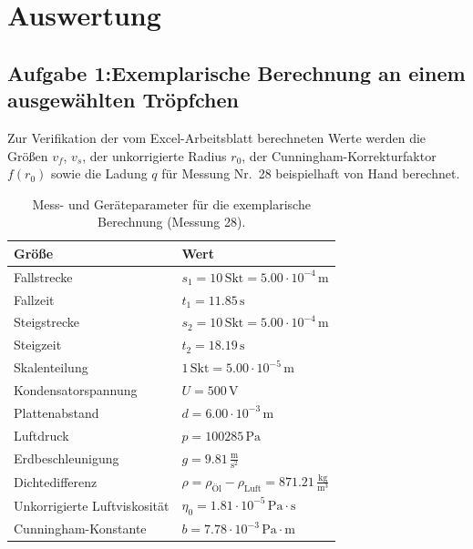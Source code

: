 \documentclass[12pt,a4paper,titlepage]{scrartcl}
\numberwithin{equation}{section}
\numberwithin{table}{section}
\numberwithin{figure}{section}
\begin{document}
\begin{table}[htbp]
  \centering
  \small
  \caption{Messwerte zur Bestimmung der Elementarladung.}
    \label{table: Messung}
\end{table}



\section{Auswertung}

\subsection{Aufgabe 1:Exemplarische Berechnung an einem ausgewählten Tröpfchen}
Zur Verifikation der vom Excel-Arbeitsblatt berechneten Werte werden die Größen $v_f$, $v_s$, der unkorrigierte Radius $r_0$, der Cunningham-Korrekturfaktor $f(r_0)$ sowie die Ladung $q$ für Messung Nr.~28 beispielhaft von Hand berechnet.

\begin{table}[H]
    \centering
    \caption{Mess- und Geräteparameter für die exemplarische Berechnung (Messung 28).}
    \label{tab:parameter_messung_28}
    \begin{tabular}{ll}
        \toprule
        \textbf{Größe} & \textbf{Wert} \\
        \midrule
        Fallstrecke & $s_1 = 10\,\text{Skt} = 5.00 \cdot 10^{-4}\,\text{m}$ \\
        Fallzeit & $t_1 = 11.85\,\text{s}$ \\
        Steigstrecke & $s_2 = 10\,\text{Skt} = 5.00 \cdot 10^{-4}\,\text{m}$ \\
        Steigzeit & $t_2 = 18.19\,\text{s}$ \\
        Skalenteilung & $1\,\text{Skt} = 5.00 \cdot 10^{-5}\,\text{m}$ \\
        Kondensatorspannung & $U = 500\,\text{V}$ \\
        Plattenabstand & $d = 6.00 \cdot 10^{-3}\,\text{m}$ \\
        Luftdruck & $p = 100285\,\text{Pa}$ \\
        Erdbeschleunigung & $g = 9.81\,\frac{\text{m}}{\text{s}^2}$ \\
        Dichtedifferenz & $\rho = \rho_{\text{Öl}} - \rho_{\text{Luft}} = 871.21\,\frac{\text{kg}}{\text{m}^3}$ \\
        Unkorrigierte Luftviskosität & $\eta_0 = 1.81 \cdot 10^{-5}\,\text{Pa}\cdot\text{s}$ \\
        Cunningham-Konstante & $b = 7.78 \cdot 10^{-3}\,\text{Pa}\cdot\text{m}$ \\
        \bottomrule
    \end{tabular}
\end{table}
\end{document}
